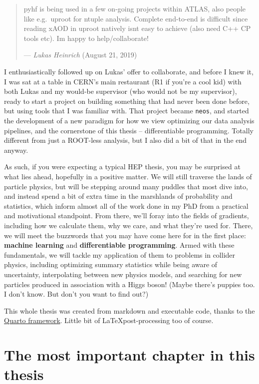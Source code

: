 \documentclass[
  11pt,
  numbers=noendperiod]{book}
\begin{document}
\begin{quote}
    pyhf is being used in a few on-going projects within ATLAS, also people
like e.g.~uproot for ntuple analysis. Complete end-to-end is difficult
since reading xAOD in uproot natively isn\textquotesingle t easy to
achieve (also need C++ CP tools etc). I\textquotesingle m happy to
help/collaborate!

\hfill--- \textit{Lukas Heinrich} (August 21, 2019)
\end{quote}


I enthusiastically followed up on Lukas' offer to collaborate, and
before I knew it, I was sat at a table in CERN's main restaurant (R1 if
you're a cool kid) with both Lukas and my would-be supervisor (who would
not be my supervisor), ready to start a project on building something
that had never been done before, but using tools that I was familiar
with. That project became \texttt{neos}, and started the development of
a new paradigm for how we view optimizing our data analysis pipelines,
and the cornerstone of this thesis -- differentiable programming.
Totally different from just a ROOT-less analysis, but I also did a bit
of that in the end anyway.

As such, if you were expecting a typical HEP thesis, you may be
surprised at what lies ahead, hopefully in a positive matter. We will
still traverse the lands of particle physics, but will be stepping
around many puddles that most dive into, and instead spend a bit of
extra time in the marshlands of probability and statistics, which inform
almost all of the work done in my PhD from a practical and motivational
standpoint. From there, we'll foray into the fields of gradients,
including how we calculate them, why we care, and what they're used for.
There, we will meet the buzzwords that you may have come here for in the
first place: \textbf{machine learning} and \textbf{differentiable
programming}. Armed with these fundamentals, we will tackle my
application of them to problems in collider physics, including
optimizing summary statistics while being aware of uncertainty,
interpolating between new physics models, and searching for new
particles produced in association with a Higgs boson! (Maybe there's
puppies too. I don't know. But don't you want to find out?)

This whole thesis was created from markdown and executable code, thanks to the
\href{http://quarto.com}{Quarto framework}. Little bit of \LaTeX post-processing too of course.

\hypertarget{motivation}{%
\chapter*{The most important chapter in this thesis}\label{motivation}}
\end{document}
